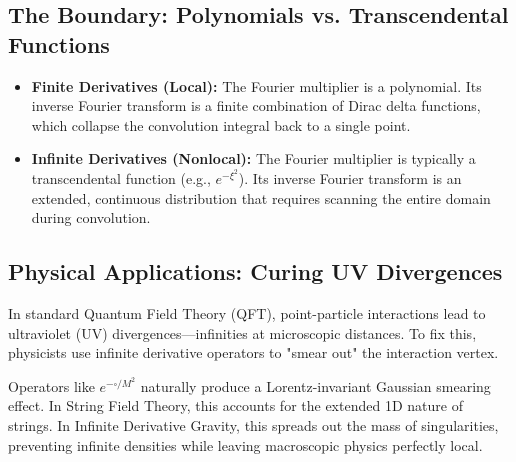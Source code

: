 \documentclass[11pt, a4paper]{article}
\begin{document}
\subsection{The Boundary: Polynomials vs. Transcendental Functions}
\begin{itemize}
    \item \textbf{Finite Derivatives (Local):} The Fourier multiplier is a polynomial. Its inverse Fourier transform is a finite combination of Dirac delta functions, which collapse the convolution integral back to a single point.
    \item \textbf{Infinite Derivatives (Nonlocal):} The Fourier multiplier is typically a transcendental function (e.g., $e^{-\xi^2}$). Its inverse Fourier transform is an extended, continuous distribution that requires scanning the entire domain during convolution.
\end{itemize}

\subsection{Physical Applications: Curing UV Divergences}
In standard Quantum Field Theory (QFT), point-particle interactions lead to ultraviolet (UV) divergences—infinities at microscopic distances. To fix this, physicists use infinite derivative operators to "smear out" the interaction vertex.

\begin{tcolorbox}[colback=blue!5!white, colframe=blue!75!black, title=String Theory \& Gravity]
Operators like $e^{-\square / M^2}$ naturally produce a Lorentz-invariant Gaussian smearing effect. In String Field Theory, this accounts for the extended 1D nature of strings. In Infinite Derivative Gravity, this spreads out the mass of singularities, preventing infinite densities while leaving macroscopic physics perfectly local.
\end{tcolorbox}
\end{document}
